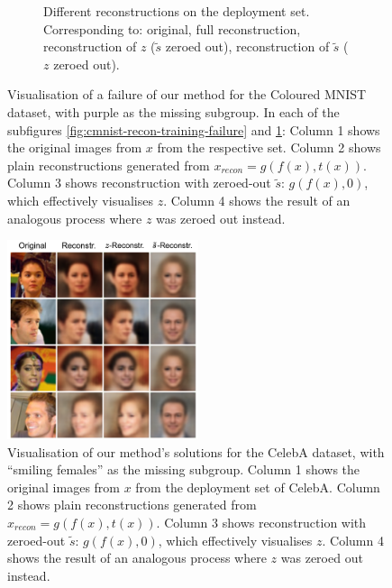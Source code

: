 \begin{figure}[tp]
\begin{subfigure}[b]{0.49\columnwidth}
    \caption{
    Different reconstructions on the deployment set. 
    Corresponding to: original, full reconstruction, reconstruction of $z$ ($\tilde{s}$ zeroed
    out), reconstruction of $\tilde{s}$ ($z$ zeroed out).
    }%
    \label{fig:cmnist-recon-deployment-failure}
  \end{subfigure}
  \caption{
   Visualisation of a failure of our method for the Coloured MNIST dataset, with
   {\color{purple}purple} as the missing subgroup. 
   In each of the subfigures \ref{fig:cmnist-recon-training-failure} and
   \ref{fig:cmnist-recon-deployment-failure}: Column 1 shows the original images from $x$ from the
   respective set. Column 2 shows plain reconstructions generated from $x_\textit{recon}=g(f(x),
   t(x))$. Column 3 shows reconstruction with zeroed-out $\tilde{s}$: $g(f(x), 0)$, which
   effectively visualises $z$. Column 4 shows the result of an analogous process where $z$ was
   zeroed out instead.
  }%
  \label{fig:cmnist-recon-failure}
\end{figure}%
%
\begin{figure}[htp]
     \centering
     \includegraphics[width=0.5\textwidth]{supmatch/example_images/reconstructions_celeba.png}
     \caption{%
       Visualisation of our method's solutions for the CelebA dataset, with ``smiling females'' as
       the missing subgroup. 
       Column 1 shows the original images from $x$ from the deployment set of CelebA. 
       Column 2 shows plain reconstructions generated from $x_\textit{recon}=g(f(x), t(x))$.
       Column 3 shows reconstruction with zeroed-out $\tilde{s}$: $g(f(x), 0)$, which effectively
       visualises $z$. 
       Column 4 shows the result of an analogous process where $z$ was zeroed out instead.
     }%
     \label{fig:celeba-recons}
\end{figure}%
%
